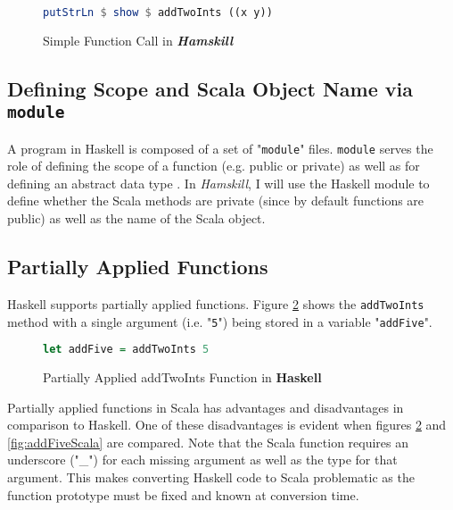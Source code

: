 \documentclass{report}
\begin{document}
\begin{figure}[H]\label{fig:addTwoNumbersHamskill}
\begin{mdframed}
\begin{lstlisting}[language=Haskell]
putStrLn $ show $ addTwoInts ((x y))
\end{lstlisting}
\end{mdframed}
\caption{Simple Function Call in \textbf\emph{Hamskill}}
\end{figure}

\subsection{Defining Scope and Scala Object Name via {\tt module}}

A program in Haskell is composed of a set of "{\tt module}" files.  {\tt module} serves the role of defining the scope of a function (e.g. public or private) as well as for defining an abstract data type \cite{haskellModule}.  In \emph{Hamskill}, I will use the Haskell module to define whether the Scala methods are private (since by default functions are public) as well as the name of the Scala object.

\subsection{Partially Applied Functions}\label{partiallyAppliedFunctions}

Haskell supports partially applied functions.  Figure \ref{fig:addFiveHaskell} shows the {\tt addTwoInts} method with a single argument (i.e. "{\tt 5}") being stored in a variable "{\tt addFive}".  

\begin{figure}[H]\label{fig:addFiveHaskell}
\begin{mdframed}
\begin{lstlisting}[language=Haskell]
let addFive = addTwoInts 5
\end{lstlisting}
\end{mdframed}
\caption{Partially Applied addTwoInts Function in \textbf{Haskell}}
\end{figure}

Partially applied functions in Scala has advantages and disadvantages in comparison to Haskell.  One of these disadvantages is evident when figures \ref{fig:addFiveHaskell} and \ref{fig:addFiveScala} are compared.  Note that the Scala function requires an underscore ("\_") for each missing argument as well as the type for that argument.  This makes converting Haskell code to Scala problematic as the function prototype must be fixed and known at conversion time.  
\end{document}
